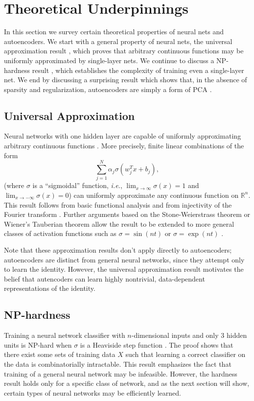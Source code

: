 \documentclass[twocolumn]{article}
\newcommand{\R}{\mathbb{R}}
\begin{document}
\section{Theoretical Underpinnings}
In this section we survey certain theoretical properties of neural nets and
autoencoders. We start with a general property of neural nets, the universal
approximation result \cite{cybenko1989approximation}, which proves that
arbitrary continuous functions may be uniformly approximated by single-layer
nets. We continue to discuss a NP-hardness result \cite{blum1992training}, which
establishes the complexity of training even a single-layer net. We end by
discussing a surprising result which shows that, in the absence of sparsity and
regularization, autoencoders are simply a form of PCA \cite{bourlard1988auto}.

\subsection{Universal Approximation}
Neural networks with one hidden layer are capable of uniformly approximating
arbitrary continuous functions \cite{cybenko1989approximation}. More precisely,
finite linear combinations of the form
\[\sum_{j=1}^N \alpha_j \sigma(w_j^T x + b_j), \]
(where $\sigma$ is a ``sigmoidal'' function, \textit{i.e.}, $\lim_{x \to \infty}
\sigma(x) = 1$ and $\lim_{x \to -\infty} \sigma(x) = 0$) can uniformly
approximate any continuous function on $\R^n$.  This result follows from basic
functional analysis and from injectivity of the Fourier transform
\cite{rudin1991functional}. Further arguments based on the Stone-Weierstrass
theorem or Wiener's Tauberian theorem allow the result to be extended to more
general classes of activation functions such as $\sigma = \sin(nt)$ or $\sigma =
\exp(nt)$ \cite{rudin1991functional}.

Note that these approximation results don't apply directly to autoencoders; 
autoencoders are distinct from general neural networks, since
they attempt only to learn the identity. However, the universal
approximation result motivates the belief that autencoders can learn
highly nontrivial, data-dependent representations of the identity.

\subsection{NP-hardness}
Training a neural network classifier with $n$-dimensional inputs and only $3$
hidden units is NP-hard when $\sigma$ is a Heaviside step function
\cite{blum1992training}. The proof shows that there exist some sets of training
data $X$ such that learning a correct classifier on the data is combinatorially
intractable. This result emphasizes the fact that training of a
general neural network may be infeasible. However, the hardness result holds
only for a specific class of network, and as the next section will show, certain
types of neural networks may be efficiently learned.
\end{document}
